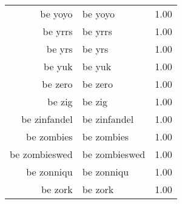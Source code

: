 \begin{table}[ht]
\begin{tabular}{rlr}
  be yoyo & be yoyo & 1.00 \\ 
  be yrrs & be yrrs & 1.00 \\ 
  be yrs & be yrs & 1.00 \\ 
  be yuk & be yuk & 1.00 \\ 
  be zero & be zero & 1.00 \\ 
  be zig & be zig & 1.00 \\ 
  be zinfandel & be zinfandel & 1.00 \\ 
  be zombies & be zombies & 1.00 \\ 
  be zombieswed & be zombieswed & 1.00 \\ 
  be zonniqu & be zonniqu & 1.00 \\ 
  be zork & be zork & 1.00 \\ 
   \hline
\end{tabular}
\end{table}
